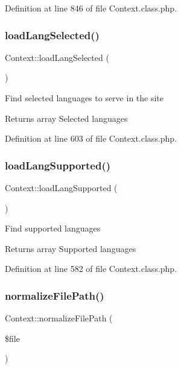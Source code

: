 Definition at line 846 of file Context.\+class.\+php.

\mbox{\label{classContext_afe4b34f1e0286152e17981fd1da3a560}} 
\subsubsection{\texorpdfstring{load\+Lang\+Selected()}{loadLangSelected()}}
{\footnotesize\ttfamily Context\+::load\+Lang\+Selected (\begin{DoxyParamCaption}{ }\end{DoxyParamCaption})}

Find selected languages to serve in the site

\begin{DoxyReturn}{Returns}
array Selected languages 
\end{DoxyReturn}


Definition at line 603 of file Context.\+class.\+php.

\mbox{\label{classContext_aec949117f584972aa60416e60f460c8b}} 
\subsubsection{\texorpdfstring{load\+Lang\+Supported()}{loadLangSupported()}}
{\footnotesize\ttfamily Context\+::load\+Lang\+Supported (\begin{DoxyParamCaption}{ }\end{DoxyParamCaption})}

Find supported languages

\begin{DoxyReturn}{Returns}
array Supported languages 
\end{DoxyReturn}


Definition at line 582 of file Context.\+class.\+php.

\mbox{\label{classContext_a47a8a7878385f0d5cb7085f933157128}} 
\subsubsection{\texorpdfstring{normalize\+File\+Path()}{normalizeFilePath()}}
{\footnotesize\ttfamily Context\+::normalize\+File\+Path (\begin{DoxyParamCaption}\item[{}]{\$file }\end{DoxyParamCaption})}

